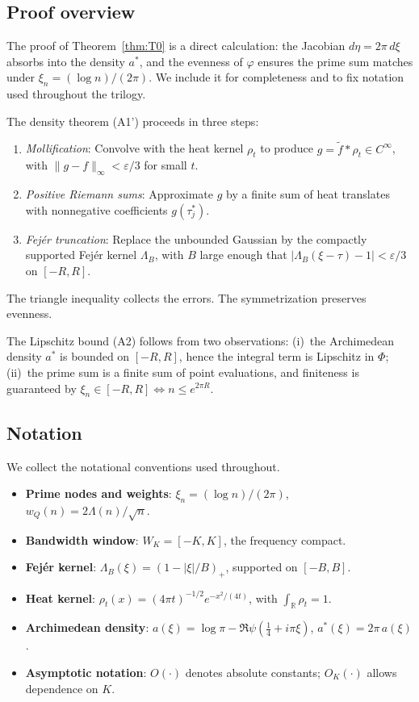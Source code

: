 \documentclass[11pt,a4paper]{article}
\theoremstyle{definition}
\theoremstyle{remark}
\newcommand{\R}{\mathbb{R}}
\begin{document}
\subsection{Proof overview}

The proof of Theorem~\ref{thm:T0} is a direct calculation: the Jacobian $d\eta = 2\pi\, d\xi$ absorbs into the density $a^*$, and the evenness of $\varphi$ ensures the prime sum matches under $\xi_n = (\log n)/(2\pi)$. We include it for completeness and to fix notation used throughout the trilogy.

The density theorem (A1') proceeds in three steps:
\begin{enumerate}[label=(\roman*)]
  \item \emph{Mollification}: Convolve with the heat kernel $\rho_t$ to produce $g = \widetilde{f} * \rho_t \in C^\infty$, with $\|g - f\|_\infty < \varepsilon/3$ for small $t$.
  \item \emph{Positive Riemann sums}: Approximate $g$ by a finite sum of heat translates with nonnegative coefficients $g(\tau_j^*)$.
  \item \emph{Fej\'er truncation}: Replace the unbounded Gaussian by the compactly supported Fej\'er kernel $\Lambda_B$, with $B$ large enough that $|\Lambda_B(\xi - \tau) - 1| < \varepsilon/3$ on $[-R, R]$.
\end{enumerate}
The triangle inequality collects the errors. The symmetrization preserves evenness.

The Lipschitz bound (A2) follows from two observations: (i)~the Archimedean density $a^*$ is bounded on $[-R, R]$, hence the integral term is Lipschitz in $\Phi$; (ii)~the prime sum is a finite sum of point evaluations, and finiteness is guaranteed by $\xi_n \in [-R, R] \Leftrightarrow n \leq e^{2\pi R}$.

\subsection{Notation}\label{sec:notation}

We collect the notational conventions used throughout.

\begin{itemize}[leftmargin=2em]
  \item \textbf{Prime nodes and weights}: $\xi_n = (\log n)/(2\pi)$, $w_Q(n) = 2\Lambda(n)/\sqrt{n}$.
  \item \textbf{Bandwidth window}: $W_K = [-K, K]$, the frequency compact.
  \item \textbf{Fej\'er kernel}: $\Lambda_B(\xi) = (1 - |\xi|/B)_+$, supported on $[-B, B]$.
  \item \textbf{Heat kernel}: $\rho_t(x) = (4\pi t)^{-1/2} e^{-x^2/(4t)}$, with $\int_\R \rho_t = 1$.
  \item \textbf{Archimedean density}: $a(\xi) = \log\pi - \Re\psi(\tfrac{1}{4} + i\pi\xi)$, $a^*(\xi) = 2\pi\, a(\xi)$.
  \item \textbf{Asymptotic notation}: $O(\cdot)$ denotes absolute constants; $O_K(\cdot)$ allows dependence on $K$.
\end{itemize}
\end{document}
